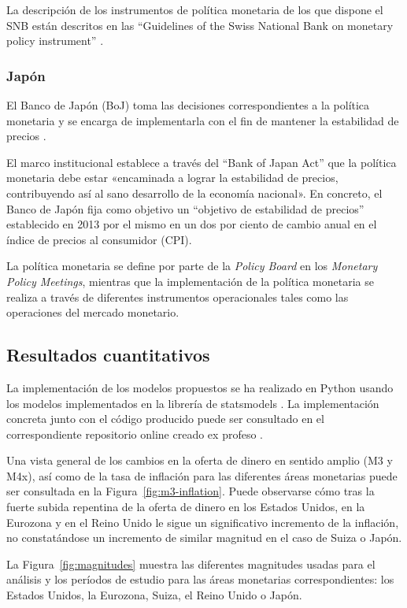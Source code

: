 \documentclass[titlepage, 12pt]{article}
\begin{document}
La descripción de los instrumentos de política monetaria de los que dispone el SNB están descritos en las \enquote{Guidelines of the Swiss National Bank on monetary policy instrument} \autocite{snb2024b}.

\subsubsection{Japón}
El Banco de Japón (BoJ) toma las decisiones correspondientes a la política monetaria y se encarga de implementarla con el fin de mantener la estabilidad de precios \autocite{boj2024a}.

El marco institucional establece a través del \enquote{Bank of Japan Act} que la política monetaria debe estar «encaminada a lograr la estabilidad de precios, contribuyendo así al sano desarrollo de la economía nacional». En concreto, el Banco de Japón fija como objetivo un \enquote{objetivo de estabilidad de precios} establecido en 2013 por el mismo en un dos por ciento de cambio anual en el índice de precios al consumidor (CPI).

La política monetaria se define por parte de la \textit{Policy Board} en los \textit{Monetary Policy Meetings}, mientras que la implementación de la política monetaria se realiza a través de diferentes instrumentos operacionales tales como las operaciones del mercado monetario.

\subsection{Resultados cuantitativos}
La implementación de los modelos propuestos se ha realizado en Python usando los modelos implementados en la librería de statsmodels \autocite{statsmodels2024a}. La implementación concreta junto con el código producido puede ser consultado en el correspondiente repositorio online creado ex profeso \autocite{github2024}.

Una vista general de los cambios en la oferta de dinero en sentido amplio (M3 y M4x), así como de la tasa de inflación para las diferentes áreas monetarias puede ser consultada en la Figura~\ref{fig:m3-inflation}. Puede observarse cómo tras la fuerte subida repentina de la oferta de dinero en los Estados Unidos, en la Eurozona y en el Reino Unido le sigue un significativo incremento de la inflación, no constatándose un incremento de similar magnitud en el caso de Suiza o Japón.

La Figura~\ref{fig:magnitudes} muestra las diferentes magnitudes usadas para el análisis y los períodos de estudio para las áreas monetarias correspondientes: los Estados Unidos, la Eurozona, Suiza, el Reino Unido o Japón.
\end{document}
